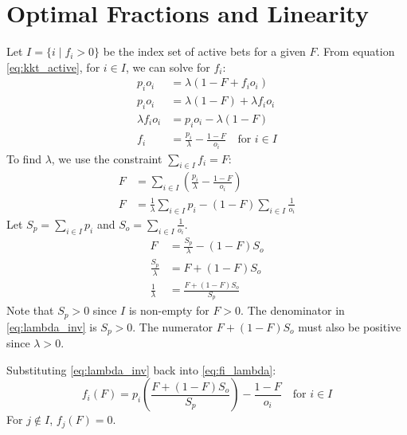 \documentclass[11pt, letterpaper]{article}
\theoremstyle{definition}
\begin{document}
\section{Optimal Fractions and Linearity}
\label{sec:fractions}

Let $I = \{i \mid f_i > 0\}$ be the index set of active bets for a given $F$. From equation \eqref{eq:kkt_active}, for $i \in I$, we can solve for $f_i$:
\begin{align}
    p_i o_i &= \lambda (1 - F + f_i o_i) \\
    p_i o_i &= \lambda (1 - F) + \lambda f_i o_i \\
    \lambda f_i o_i &= p_i o_i - \lambda (1 - F) \\
    f_i &= \frac{p_i}{\lambda} - \frac{1 - F}{o_i} \quad \text{for } i \in I \label{eq:fi_lambda}
\end{align}
To find $\lambda$, we use the constraint $\sum_{i \in I} f_i = F$:
\begin{align*}
    F &= \sum_{i \in I} \left( \frac{p_i}{\lambda} - \frac{1 - F}{o_i} \right) \\
    F &= \frac{1}{\lambda} \sum_{i \in I} p_i - (1 - F) \sum_{i \in I} \frac{1}{o_i}
\end{align*}
Let $S_p = \sum_{i \in I} p_i$ and $S_o = \sum_{i \in I} \frac{1}{o_i}$.
\begin{align*}
    F &= \frac{S_p}{\lambda} - (1 - F) S_o \\
    \frac{S_p}{\lambda} &= F + (1 - F) S_o \\
    \frac{1}{\lambda} &= \frac{F + (1 - F) S_o}{S_p} \label{eq:lambda_inv}
\end{align*}
Note that $S_p > 0$ since $I$ is non-empty for $F > 0$. The denominator in \eqref{eq:lambda_inv} is $S_p > 0$. The numerator $F + (1-F)S_o$ must also be positive since $\lambda > 0$.

Substituting \eqref{eq:lambda_inv} back into \eqref{eq:fi_lambda}:
\begin{equation}
    f_i(F) = p_i \left( \frac{F + (1 - F) S_o}{S_p} \right) - \frac{1 - F}{o_i} \quad \text{for } i \in I
    \label{eq:fi_explicit}
\end{equation}
For $j \notin I$, $f_j(F) = 0$.
\end{document}
